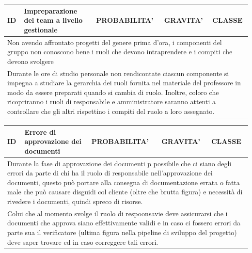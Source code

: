 	\begin{table}[H]
		\centering
		\begin{tabularx}{\columnwidth}{|m{1.5cm}|m{4.2cm}|m{2.7cm}|m{2.7cm}|m{2.7cm}|}
			\hline
			ID & 
			Impreparazione del team a livello gestionale & 
			PROBABILITA' & 
			GRAVITA' &
			CLASSE\\
			\hline
			\multicolumn{5}{|X|}{
				Non avendo affrontato progetti del genere prima d'ora, i componenti del gruppo non conoscono bene i ruoli che devono intraprendere e i compiti che devono svolgere
			}\\
			\hline
			\multicolumn{5}{|X|}{
				Durante le ore di studio personale non rendicontate ciascun componente si impegna a studiare la gerarchia dei ruoli fornita nel materiale del professore in modo da essere preparati quando si cambia di ruolo.
				Inoltre, coloro che ricopriranno i ruoli di responsabile e amministratore saranno attenti a controllare che gli altri rispettino i compiti del ruolo a loro assegnato.
			}\\
			\hline
		\end{tabularx}
	\end{table}
	
	\begin{table}[H]
		\centering
		\begin{tabularx}{\columnwidth}{|m{1.5cm}|m{4.2cm}|m{2.7cm}|m{2.7cm}|m{2.7cm}|}
			\hline
			ID & 
			Errore di approvazione dei documenti & 
			PROBABILITA' & 
			GRAVITA' & 
			CLASSE\\
			\hline
			\multicolumn{5}{|X|}{Durante la fase di approvazione dei documenti p possibile che ci siano degli errori da parte di chi ha il ruolo di responsabile nell'approvazione dei documenti, questo può portare alla consegna di documentazione errata o fatta male che può causare disguidi col cliente (oltre che brutta figura) e necessità di rivedere i documenti, quindi spreco di risorse.}\\
			\hline
			\multicolumn{5}{|X|}{Colui che al momento svolge il ruolo di respoonsavie deve assicurarsi che i documenti che approva siano effettivamente validi e in caso ci fossero errori da parte sua il verificatore (ultima figura nella pipeline di sviluppo del progetto) deve saper trovare ed in caso correggere tali errori.}\\
			\hline
		\end{tabularx}
	\end{table}
	
